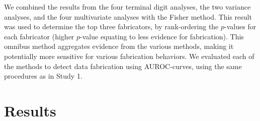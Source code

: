 \documentclass{article}
\begin{document}
We combined the results from the four terminal digit analyses, the two variance analyses, and the four multivariate analyses with the Fisher method. This result was used to determine the top three fabricators, by rank-ordering the $p$-values for each fabricator (higher $p$-value equating to less evidence for fabrication). This omnibus method aggregates evidence from the various methods, making it potentially more sensitive for various fabrication behaviors. We evaluated each of the methods to detect data fabrication using AUROC-curves, using the same procedures as in Study 1.

\section*{Results}
\end{document}
